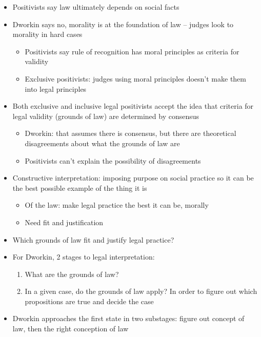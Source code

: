 \begin{itemize}
\tightlist
\item
  Positivists say law ultimately depends on social facts
\item
  Dworkin says no, morality is at the foundation of law -- judges look
  to morality in hard cases

  \begin{itemize}
  \tightlist
  \item
    Positivists say rule of recognition has moral principles as criteria
    for validity
  \item
    Exclusive positivists: judges using moral principles doesn't make
    them into legal principles
  \end{itemize}
\item
  Both exclusive and inclusive legal positivists accept the idea that
  criteria for legal validity (grounds of law) are determined by
  consensus

  \begin{itemize}
  \tightlist
  \item
    Dworkin: that assumes there is consensus, but there are theoretical
    disagreements about what the grounds of law are
  \item
    Positivists can't explain the possibility of disagreements
  \end{itemize}
\item
  Constructive interpretation: imposing purpose on social practice so it
  can be the best possible example of the thing it is

  \begin{itemize}
  \tightlist
  \item
    Of the law: make legal practice the best it can be, morally
  \item
    Need fit and justification
  \end{itemize}
\item
  Which grounds of law fit and justify legal practice?
\item
  For Dworkin, 2 stages to legal interpretation:

  \begin{enumerate}
  \def\labelenumi{\arabic{enumi}.}
  \tightlist
  \item
    What are the grounds of law?
  \item
    In a given case, do the grounds of law apply? In order to figure out
    which propositions are true and decide the case
  \end{enumerate}
\item
  Dworkin approaches the first state in two substages: figure out
  concept of law, then the right conception of law


\end{itemize}

